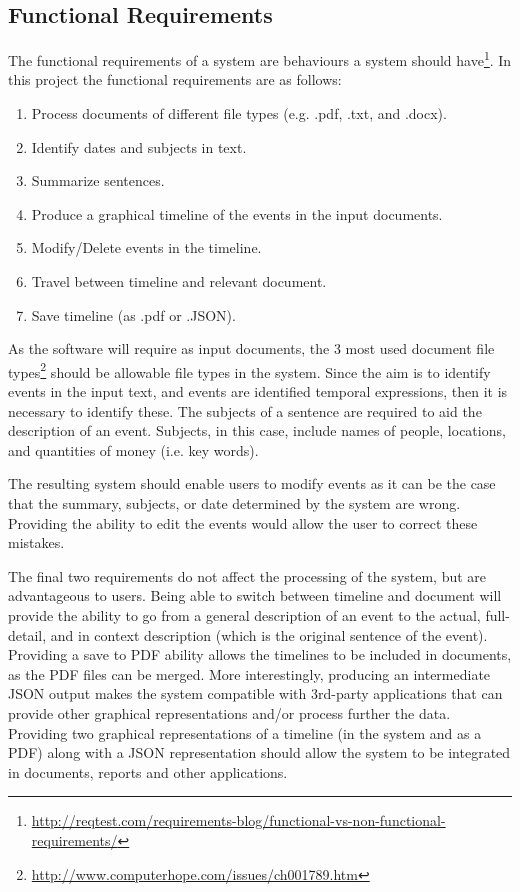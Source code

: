 \subsection{Functional Requirements}
\par The functional requirements of a system are behaviours a system should have\footnote{\url{http://reqtest.com/requirements-blog/functional-vs-non-functional-requirements/}}. In this project the functional requirements are as follows:
\begin{enumerate}
\item Process documents of different file types (e.g. .pdf, .txt, and .docx).
\item Identify dates and subjects in text.
\item Summarize sentences.
\item Produce a graphical timeline of the events in the input documents.
\item Modify/Delete events in the timeline.
\item Travel between timeline and relevant document.
\item Save timeline (as .pdf or .JSON).
\end{enumerate} 
\par As the software will require as input documents, the 3 most used document file types\footnote{\url{http://www.computerhope.com/issues/ch001789.htm}} should be allowable file types in the system. Since the aim is to identify events in the input text, and events are identified temporal expressions, then it is necessary to identify these. The subjects of a sentence are required to  aid the description of an event. Subjects, in this case, include names of people, locations, and quantities of money (i.e. key words).
\par The resulting system should enable users to modify events as it can be the case that the summary, subjects, or date determined by the system are wrong. Providing the ability to edit the events would allow the user to correct these mistakes. 
\par The final two requirements do not affect the processing of the system, but are advantageous to users. Being able to switch between timeline and document will provide the ability to go from a general description of an event to the actual, full-detail, and in context description (which is the original sentence of the event). Providing a save to PDF ability allows the timelines to be included in documents, as the PDF files can be merged. More interestingly, producing an intermediate JSON output makes the system compatible with 3rd-party applications that can provide other graphical representations and/or process further the data. Providing two graphical representations of a timeline (in the system and as a PDF) along with a JSON representation should allow the system to be integrated in documents, reports and other applications.

